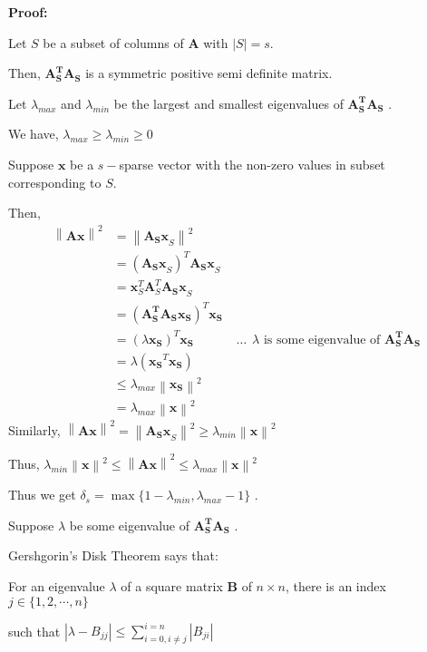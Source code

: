 \documentclass[fleqn, 11pt]{article}
\newcommand{\bs}[1]{\boldsymbol{#1}}
\newcommand\norm[1]{\left\lVert#1\right\rVert}
\begin{document}
\textbf{Proof:}
\smallskip

Let $S$ be a subset of columns of $\bs{A}$ with $|S|=s$. 

\medskip 

Then, $\bs{A_S^TA_S}$ is a symmetric positive semi definite matrix. 

\medskip 

Let $\lambda_{max}$ and $\lambda_{min}$ be the largest and smallest eigenvalues of $\bs{A_S^TA_S}$ . 

We have, $\lambda_{max} \geq   \lambda_{min} \geq 0$


Suppose $\bs{x}$ be a $s-$sparse vector with the non-zero values in subset corresponding to $S$. 

Then,
\begin{align*}
    \norm{\bs{Ax}}^2 &= \norm{\bs{A_Sx}_S}^2  \\
&= (\bs{A_Sx}_S)^T \bs{A_Sx}_S \\
&= \bs{x}_S^T  \bs{A}_S^T \bs{A_Sx}_S     \\
&= (\bs{A_S^TA_Sx_S})^T \bs{x_S} \\
&=  (\lambda \bs{x_S})^T \bs{x_S}  \hspace{40pt} 
 \ldots \hspace{5pt} \lambda \text{ is some eigenvalue of } \bs{A_S^TA_S}  \\
&= \lambda (\bs{x_S}^T \bs{x_S}) \\
&\leq \lambda_{max} \bs{\norm{x_S}}^2\\
&= \lambda_{max} \bs{\norm{x}}^2
\end{align*}
Similarly,
$\norm{\bs{Ax}} ^2 = \norm{\bs{A_Sx}_S}  ^2 \geq \lambda_{min} \bs{\norm{x}}^2 $

\medskip

Thus, $\lambda_{min} \bs{\norm{x}}^2 \leq \bs{\norm{Ax}}^2 \leq \lambda_{max} \bs{\norm{x}}^2$

\medskip 
Thus we get $\delta_s = \max \{ 1 - \lambda_{min} , \lambda_{max} -1 \}$ . 

\medskip 


\medskip 
Suppose $ \lambda  $ be some eigenvalue of $\bs{A_S^TA_S}$ . 

\medskip 

Gershgorin’s Disk Theorem says that: 

For an eigenvalue $\lambda$ of a square matrix $\bs{B}$ of $n \times n$, there is an index $j \in \{ 1,2,\cdots,n \}$

such that $| \lambda - B_{jj} | \leq \displaystyle \sum_{i=0, i \neq j}^{i=n} |B_{ji} |$
\end{document}
